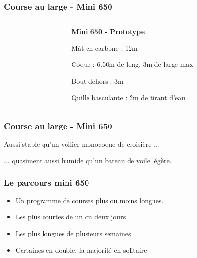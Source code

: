 \documentclass{beamer}
\begin{document}
\begin{frame}
  \frametitle{Course au large - Mini 650}

  \begin{columns}
    \begin{column}{0.4\textwidth}
      \begin{center}
      \end{center}
    \end{column}
    \begin{column}{0.6\textwidth}
      \textbf{Mini 650 - Prototype}
      \vspace{1em}
      
      Mât en carbone : 12m\\

      \vspace{2em}

      \pause Coque : 6.50m de long, 3m de large max\\

      \vspace{2em}

      \pause Bout dehors : 3m\\

      \vspace{2em}

      \pause Quille basculante : 2m de tirant d'eau\\
    \end{column}
  \end{columns}
\end{frame}

\begin{frame}
  \frametitle{Course au large - Mini 650}

  Aussi stable qu'un voilier monocoque de croisière ... \\

  \vspace{6em}

  \pause ... quasiment aussi humide qu'un bateau de voile légère.
\end{frame}

\begin{frame}
  \frametitle{Le parcours mini 650}

  \begin{center}
  \end{center}
  \begin{itemize}
    \item Un programme de courses plus ou moins longues.
    \pause \item Les plus courtes de un ou deux jours
    \pause \item Les plus longues de plusieurs semaines
    \pause \item Certaines en double, la majorité en solitaire
  \end{itemize}
\end{frame}
\end{document}
